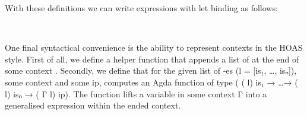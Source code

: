 With these definitions we can write expressions with let binding as follows:
\begin{code}%
%
\>[2]\AgdaFunction{\AgdaUnderscore{}}\AgdaSpace{}%
\AgdaSymbol{:}\AgdaSpace{}%
\AgdaSpace{}%
\AgdaSpace{}%
\AgdaSymbol{(}\AgdaSpace{}%
\AgdaInductiveConstructor{[]}\AgdaSymbol{)}\<%
\\
%
\>[2]\AgdaSymbol{\AgdaUnderscore{}}\AgdaSpace{}%
\AgdaSymbol{=}\AgdaSpace{}%
\AgdaSpace{}%
\AgdaSpace{}%
\AgdaFunction{:=}\AgdaSpace{}%
\AgdaSpace{}%
\AgdaSpace{}%
\AgdaSpace{}%
\AgdaSpace{}%
\AgdaFunction{:=}\AgdaSpace{}%
\AgdaSpace{}%
\AgdaSpace{}%
\AgdaSpace{}%
\AgdaSpace{}%
\AgdaSymbol{(}\AgdaSpace{}%
\AgdaSpace{}%
\AgdaSymbol{)}\AgdaSpace{}%
\AgdaSpace{}%
\<%
\end{code}
One final syntactical convenience is the ability to
represent contexts in the HOAS style.
First of all, we define a helper function  that appends a list of 
at the end of some context .
Secondly, we define  that for the given list of -es
(l = [is₁, \dots, isₙ]), some context  and some 
ip, computes an Agda function of type ( (  l) is₁ →
\dots →  (  l) isₙ →  ( Γ l) ip).
The function  lifts a variable in some context Γ into
a generalised expression within the ended context.
